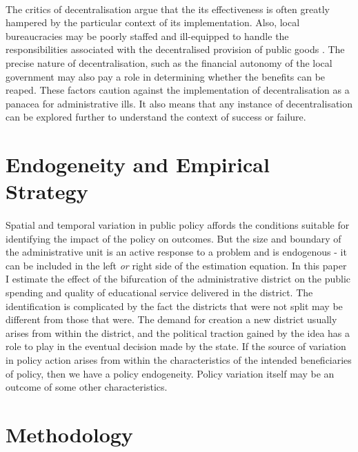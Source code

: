 \documentclass[12pt, a4paper]{article}
\begin{document}
\paragraph{} The critics of decentralisation argue that the its effectiveness is often greatly hampered by the particular context of its implementation.  Also, local bureaucracies may be poorly staffed and ill-equipped to handle the responsibilities associated with the decentralised provision of public goods \parencite{prud1995dangers}. The precise nature of decentralisation, such as the financial autonomy of the local government may also pay a role in determining whether the benefits can be reaped. These factors caution against the implementation of decentralisation as a panacea for administrative ills. It also means that any instance of decentralisation can be explored further to understand the context of success or failure.

\section*{Endogeneity and Empirical Strategy}
\paragraph{} Spatial and temporal variation in public policy affords the conditions suitable for identifying the impact of the policy on outcomes. But the size and boundary of the administrative unit is an active response to a problem and is endogenous - it can be included in the left \textit{or} right side of the estimation equation. In this paper I estimate the effect of the bifurcation of the administrative district on the public spending and quality of educational service delivered in the district. The identification is complicated by the fact the districts that were not split may be different from those that were. The demand for creation a new district usually arises from within the district, and the political traction gained by the idea has a role to play in the eventual decision made by the state. If the source of variation in policy action arises from within the characteristics of the intended beneficiaries of policy, then we have a policy endogeneity. Policy variation itself may be an outcome of some other characteristics. \nocite{hinnerich2009merging} \nocite{jordahl2010merged} \nocite{reingewertz2012municipal} \nocite{blesse2013municipal}
\section*{Methodology}
\end{document}
